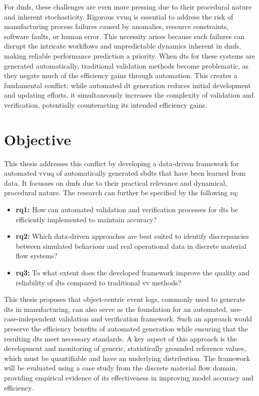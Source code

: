 For \gls{dmfs}, these challenges are even more pressing due to their procedural nature and inherent stochasticity. Rigorous \gls{vvuq} is essential to address the risk of manufacturing process failures caused by anomalies, resource constraints, software faults, or human error. This necessity arises because such failures can disrupt the intricate workflows and unpredictable dynamics inherent in \gls{dmfs}, making reliable performance prediction a priority. When \gls{dt}s for these systems are generated automatically, traditional validation methods become problematic, as they negate much of the efficiency gains through automation. This creates a fundamental conflict: while automated \gls{dt} generation reduces initial development and updating efforts, it simultaneously increases the complexity of validation and verification, potentially counteracting its intended efficiency gains.

\section{Objective}

This thesis addresses this conflict by developing a data-driven framework for automated \gls{vvuq} of automatically generated \gls{sbdt}s that have been learned from data. It focusses on \gls{dmfs} due to their practical relevance and dynamical, procedural nature. The research can further be specified by the following \gls{rq}:

\begin{itemize}
  \label{par:rq1}
  \item \textbf{\gls{rq}1:} How can automated validation and verification processes for \gls{dt}s be efficiently implemented to maintain accuracy?
        \label{par:rq2}
  \item \textbf{\gls{rq}2:} Which data-driven approaches are best suited to identify discrepancies between simulated behaviour and real operational data in discrete material flow systems?
        \label{par:rq3}
  \item \textbf{\gls{rq}3:} To what extent does the developed framework improve the quality and reliability of \gls{dt}s compared to traditional \gls{vv} methods?
\end{itemize}

This thesis proposes that object-centric event logs, commonly used to generate \gls{dt}s in manufacturing, can also serve as the foundation for an automated, use-case-independent validation and verification framework. Such an approach would preserve the efficiency benefits of automated generation while ensuring that the resulting \gls{dt}s meet necessary standards. A key aspect of this approach is the development and monitoring of generic, statistically grounded reference values, which must be quantifiable and have an underlying distribution. The framework will be evaluated using a case study from the discrete material flow domain, providing empirical evidence of its effectiveness in improving model accuracy and efficiency.

